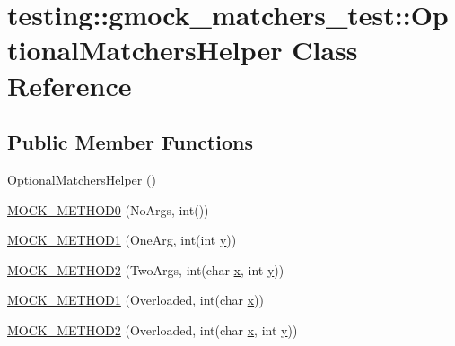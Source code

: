 \hypertarget{classtesting_1_1gmock__matchers__test_1_1_optional_matchers_helper}{}\section{testing\+::gmock\+\_\+matchers\+\_\+test\+::Optional\+Matchers\+Helper Class Reference}
\label{classtesting_1_1gmock__matchers__test_1_1_optional_matchers_helper}
\subsection*{Public Member Functions}
\begin{DoxyCompactItemize}
\item 
\mbox{\hyperlink{classtesting_1_1gmock__matchers__test_1_1_optional_matchers_helper_a24d46bb3d75555049ed3799a34d9f6b5}{Optional\+Matchers\+Helper}} ()
\item 
\mbox{\hyperlink{classtesting_1_1gmock__matchers__test_1_1_optional_matchers_helper_a8e2a60b72259529d2b6c0f37ac47dde9}{M\+O\+C\+K\+\_\+\+M\+E\+T\+H\+O\+D0}} (No\+Args, int())
\item 
\mbox{\hyperlink{classtesting_1_1gmock__matchers__test_1_1_optional_matchers_helper_ab35fac331bbcf18e1a7e95305d4cc34d}{M\+O\+C\+K\+\_\+\+M\+E\+T\+H\+O\+D1}} (One\+Arg, int(int \mbox{\hyperlink{_obj__test_2lib_2googletest-master_2googlemock_2test_2gmock-matchers__test_8cc_a39cb44155237f0205e0feb931d5acbed}{y}}))
\item 
\mbox{\hyperlink{classtesting_1_1gmock__matchers__test_1_1_optional_matchers_helper_a51f6da96a6607d70c8ea6d5f4aedb39f}{M\+O\+C\+K\+\_\+\+M\+E\+T\+H\+O\+D2}} (Two\+Args, int(char \mbox{\hyperlink{_obj__test_2lib_2googletest-master_2googlemock_2test_2gmock-matchers__test_8cc_a6150e0515f7202e2fb518f7206ed97dc}{x}}, int \mbox{\hyperlink{_obj__test_2lib_2googletest-master_2googlemock_2test_2gmock-matchers__test_8cc_a39cb44155237f0205e0feb931d5acbed}{y}}))
\item 
\mbox{\hyperlink{classtesting_1_1gmock__matchers__test_1_1_optional_matchers_helper_a782311cb85f341cf6b45f0b9f015e779}{M\+O\+C\+K\+\_\+\+M\+E\+T\+H\+O\+D1}} (Overloaded, int(char \mbox{\hyperlink{_obj__test_2lib_2googletest-master_2googlemock_2test_2gmock-matchers__test_8cc_a6150e0515f7202e2fb518f7206ed97dc}{x}}))
\item 
\mbox{\hyperlink{classtesting_1_1gmock__matchers__test_1_1_optional_matchers_helper_a2051b793f9f68027e8861ec999739b9a}{M\+O\+C\+K\+\_\+\+M\+E\+T\+H\+O\+D2}} (Overloaded, int(char \mbox{\hyperlink{_obj__test_2lib_2googletest-master_2googlemock_2test_2gmock-matchers__test_8cc_a6150e0515f7202e2fb518f7206ed97dc}{x}}, int \mbox{\hyperlink{_obj__test_2lib_2googletest-master_2googlemock_2test_2gmock-matchers__test_8cc_a39cb44155237f0205e0feb931d5acbed}{y}}))
\end{DoxyCompactItemize}
